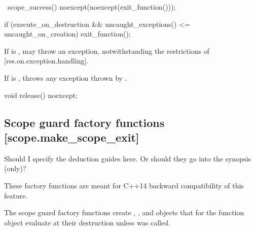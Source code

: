 \documentclass[ebook,11pt,article]{memoir}
\begin{document}
\begin{itemdecl}
~scope_success() noexcept(noexcept(exit_function()));
\end{itemdecl}

\begin{itemdescr}
\pnum
\effects
\begin{codeblock}
if (execute_on_destruction 
   && uncaught_exceptions() <= uncaught_on_creation)
	exit_function();   
\end{codeblock}

\pnum
\remarks
If  is ,  may throw an exception, notwithstanding the restrictions of [res.on.exception.handling].

\pnum
\throws
If  is , throws any exception thrown by .

\end{itemdescr}

\begin{itemdecl}
void release() noexcept;
\end{itemdecl}

\begin{itemdescr}
\pnum
\end{itemdescr}

\newpage

\subsection {Scope guard factory functions [scope.make_scope_exit]}
\begin{note}
Should I specify the deduction guides here. Or should they go into the synopsis (only)?
\end{note}
\begin{note}
These factory functions are meant for C++14 backward compatibility of this feature. 
\end{note}

\pnum
The scope guard factory functions create , , and  objects that for the function object  evaluate  at their destruction unless  was called.
\end{document}
